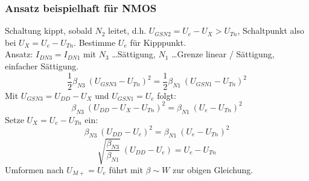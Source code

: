 \documentclass[a4paper,11pt]{article}
\begin{document}
\subsubsection*{Ansatz beispielhaft für NMOS}
Schaltung kippt, sobald $N_2$ leitet, d.h. $U_{GSN2} = U_e - U_X > U_{Tn}$, Schaltpunkt also bei $U_X = U_e - U_{Tn}$. Bestimme $U_e$ für Kipppunkt.\\
Ansatz: $I_{DN3} = I_{DN1}$ mit $N_3$ \ldots Sättigung, $N_1$ \ldots Grenze linear / Sättigung, einfacher Sättigung.
\[
	\frac{1}{2} \beta_{N3} ~ (U_{GSN3} - U_{Tn})^2 = \frac{1}{2} \beta_{N1} ~ (U_{GSN1} - U_{Tn})^2
\]
Mit $U_{GSN3} = U_{DD} - U_X$ und $U_{GSN1} = U_e$ folgt:
\[
	\beta_{N3} ~ (U_{DD} - U_X - U_{Tn})^2 =\beta_{N1} ~ (U_e - U_{Tn})^2	
\]
Setze $U_X = U_e - U_{Tn}$ ein:
\[
	\beta_{N3} ~ (U_{DD} - U_e)^2 =\beta_{N1} ~ (U_e - U_{Tn})^2	
\]
\[
	\sqrt{\frac{\beta_{N3}}{\beta_{N1}}} ~ (U_{DD} - U_e) = U_e - U_{Tn}
\]
Umformen nach $U_{M+} = U_e$ führt mit $\beta \sim W$ zur obigen Gleichung.
\end{document}
